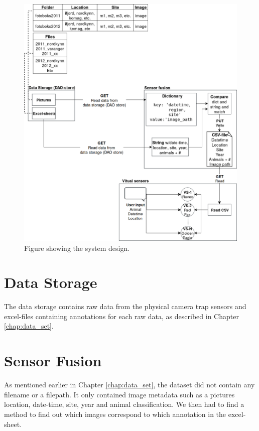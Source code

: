 \documentclass[USenglish]{uit-thesis}
\begin{document}
\begin{figure}
\centering
\includegraphics[width=\textwidth]{Design_done.png}
\caption{Figure showing the system design.}
\label{fig:design}
\end{figure}

\section{Data Storage}
The data storage contains raw data from the physical camera trap sensors and excel-files containing annotations for each raw data, as described in Chapter \ref{chap:data_set}.


\section{Sensor Fusion} \label{sec:des_fused}
As mentioned earlier in Chapter \ref{chap:data_set}, the dataset did not contain any filename or a filepath. It only contained image metadata such as a pictures location, date-time, site, year and animal classification. We then had to find a method to find out which images correspond to which annotation in the excel-sheet.
\end{document}
